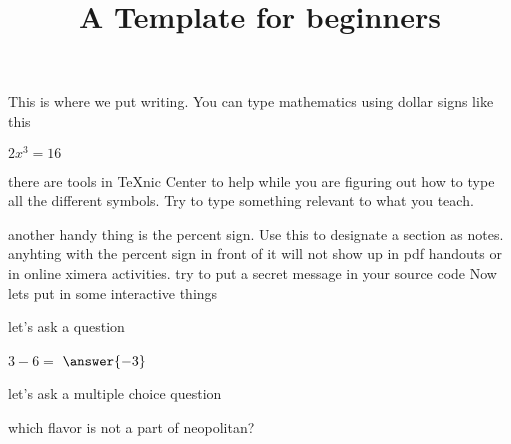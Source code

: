 \documentclass{ximera}
\title{A Template for beginners}
\begin{document}
\begin{abstract}
\end{abstract}
\maketitle
This is where we put writing. You can type mathematics using dollar signs like this
 
$2x^3=16$

there are tools in TeXnic Center to help while you are figuring out how to type all the different symbols. Try to type something relevant to what you teach.

another handy thing is the percent sign. Use this to designate a section as notes. anyhting with the percent sign in front of it will not show up in pdf handouts or in online ximera activities. try to put a secret message in your source code
Now lets put in some interactive things

let's ask a question
\begin{question} $3-6=$ $\answer{-3}$
\end{question}

let's ask a multiple choice question
\begin{question} which flavor is not a part of neopolitan?
\begin{multipleChoice}
\end{multipleChoice}
\end{question}

\end{document}

